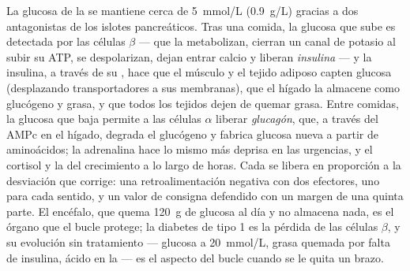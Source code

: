 \begin{proposition}\label{prop:b2:cell-signalling:glucose}
La glucosa de la  se mantiene cerca de \qty{5}{mmol/L}
(\qty{0.9}{g/L}) gracias a dos  antagonistas de los islotes
pancreáticos. Tras una comida, la glucosa que sube es detectada por las
células $\beta$ --- que la metabolizan, cierran un canal de potasio al
subir su ATP, se despolarizan, dejan entrar calcio y liberan
\emph{insulina} --- y la insulina, a través de su , hace que el músculo y el tejido adiposo capten glucosa
(desplazando transportadores a sus membranas), que el hígado la almacene
como glucógeno y grasa, y que todos los tejidos dejen de quemar grasa.
Entre comidas, la glucosa que baja permite a las células $\alpha$ liberar
\emph{glucagón}, que, a través del AMPc en el hígado, degrada el glucógeno
y fabrica glucosa nueva a partir de aminoácidos; la adrenalina hace lo
mismo más deprisa en las urgencias, y el cortisol y la  del
crecimiento a lo largo de horas. Cada  se libera en proporción a la
desviación que corrige: una retroalimentación negativa con dos efectores,
uno para cada sentido, y un valor de consigna defendido con un margen de
una quinta parte. El encéfalo, que quema \qty{120}{g} de glucosa al día y
no almacena nada, es el órgano que el bucle protege; la diabetes de
tipo 1 es la pérdida de las células $\beta$, y su evolución sin
tratamiento --- glucosa a \qty{20}{mmol/L}, grasa quemada por falta de
insulina, ácido en la  --- es el aspecto del bucle cuando se le
quita un brazo.
\end{proposition}

